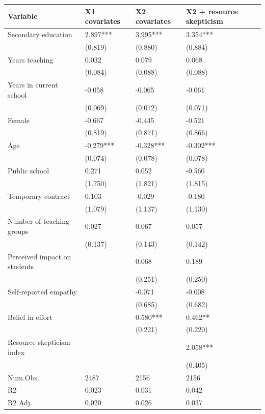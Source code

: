 \begin{tabular}{llll}
\toprule
Variable & X1 covariates & X2 covariates & X2 + resource skepticism\\
\midrule
Secondary education & 2.897*** & 3.995*** & 3.354***\\
 & (0.819) & (0.880) & (0.884)\\
Years teaching & 0.032 & 0.079 & 0.068\\
 & (0.084) & (0.088) & (0.088)\\
Years in current school & -0.058 & -0.065 & -0.061\\
\addlinespace
 & (0.069) & (0.072) & (0.071)\\
Female & -0.667 & -0.445 & -0.521\\
 & (0.819) & (0.871) & (0.866)\\
Age & -0.279*** & -0.328*** & -0.302***\\
 & (0.074) & (0.078) & (0.078)\\
\addlinespace
Public school & 0.271 & 0.052 & -0.560\\
 & (1.750) & (1.821) & (1.815)\\
Temporary contract & 0.103 & -0.029 & -0.180\\
 & (1.079) & (1.137) & (1.130)\\
Number of teaching groups & 0.027 & 0.067 & 0.057\\
\addlinespace
 & (0.137) & (0.143) & (0.142)\\
Perceived impact on students &  & 0.068 & 0.189\\
 &  & (0.251) & (0.250)\\
Self-reported empathy &  & -0.071 & -0.008\\
 &  & (0.685) & (0.682)\\
\addlinespace
Belief in effort &  & 0.580*** & 0.462**\\
 &  & (0.221) & (0.220)\\
Resource skepticism index &  &  & 2.058***\\
 &  &  & (0.405)\\
Num.Obs. & 2487 & 2156 & 2156\\
\addlinespace
R2 & 0.023 & 0.031 & 0.042\\
R2 Adj. & 0.020 & 0.026 & 0.037\\
\bottomrule
\end{tabular}
